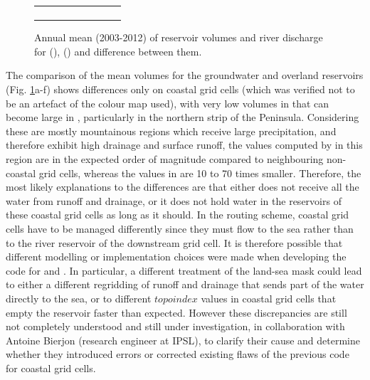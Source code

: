 \begin{figure}[htbp]
{\begin{minipage}{1.25\linewidth}
\begin{tabular}{ccc}
\begin{subfigure}[b]{0.33\linewidth}
                \end{subfigure} \\
            \end{tabular}
        \end{minipage}
    }
    \caption{Annual mean (2003-2012) of reservoir volumes and river discharge for \std (\noirr), \native (\noirr) and difference between them.}
    \label{fig:routing_reservoirs_halfdeg}
\end{figure}

The comparison of the mean volumes for the groundwater and overland reservoirs (Fig. \ref{fig:routing_reservoirs_halfdeg}a-f) shows differences only on coastal grid cells (which was verified not to be an artefact of the colour map used), with very low volumes in \std that can become large in \native, particularly in the northern strip of the Peninsula. Considering these are mostly mountainous regions which receive large precipitation, and therefore exhibit high drainage and surface runoff, the values computed by \native in this region are in the expected order of magnitude compared to neighbouring non-coastal grid cells, whereas the values in \std are 10 to 70 times smaller.
Therefore, the most likely explanations to the differences are that either \std does not receive all the water from runoff and drainage, or it does not hold water in the reservoirs of these coastal grid cells as long as it should. 
In the routing scheme, coastal grid cells have to be managed differently since they must flow to the sea rather than to the river reservoir of the downstream grid cell. It is therefore possible that different modelling or implementation choices were made when developing the code for \std and \native.
In particular, a different treatment of the land-sea mask could lead to either a different regridding of runoff and drainage that sends part of the water directly to the sea, or to different $topoindex$ values in coastal grid cells that empty the reservoir faster than expected.
However these discrepancies are still not completely understood and still under investigation, in collaboration with Antoine Bierjon (research engineer at IPSL), to clarify their cause and determine whether they introduced errors or corrected existing flaws of the previous code for coastal grid cells.

